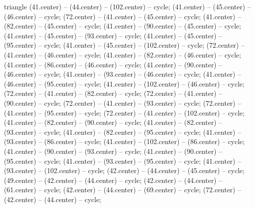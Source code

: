 \begin{pgfonlayer}{triangle}
 (41.center) -- (44.center) -- (102.center) -- cycle; 
 (41.center) -- (45.center) -- (46.center) -- cycle; 
 (72.center) -- (41.center) -- (45.center) -- cycle; 
 (41.center) -- (82.center) -- (45.center) -- cycle; 
 (41.center) -- (90.center) -- (45.center) -- cycle; 
 (41.center) -- (45.center) -- (93.center) -- cycle; 
 (41.center) -- (45.center) -- (95.center) -- cycle; 
 (41.center) -- (45.center) -- (102.center) -- cycle; 
 (72.center) -- (41.center) -- (46.center) -- cycle; 
 (41.center) -- (82.center) -- (46.center) -- cycle; 
 (41.center) -- (86.center) -- (46.center) -- cycle; 
 (41.center) -- (90.center) -- (46.center) -- cycle; 
 (41.center) -- (93.center) -- (46.center) -- cycle; 
 (41.center) -- (46.center) -- (95.center) -- cycle; 
 (41.center) -- (102.center) -- (46.center) -- cycle; 
 (72.center) -- (41.center) -- (82.center) -- cycle; 
 (72.center) -- (41.center) -- (90.center) -- cycle; 
 (72.center) -- (41.center) -- (93.center) -- cycle; 
 (72.center) -- (41.center) -- (95.center) -- cycle; 
 (72.center) -- (41.center) -- (102.center) -- cycle; 
 (41.center) -- (82.center) -- (90.center) -- cycle; 
 (41.center) -- (82.center) -- (93.center) -- cycle; 
 (41.center) -- (82.center) -- (95.center) -- cycle; 
 (41.center) -- (93.center) -- (86.center) -- cycle; 
 (41.center) -- (102.center) -- (86.center) -- cycle; 
 (41.center) -- (90.center) -- (93.center) -- cycle; 
 (41.center) -- (90.center) -- (95.center) -- cycle; 
 (41.center) -- (93.center) -- (95.center) -- cycle; 
 (41.center) -- (93.center) -- (102.center) -- cycle; 
 (42.center) -- (44.center) -- (45.center) -- cycle; 
 (49.center) -- (42.center) -- (44.center) -- cycle; 
 (42.center) -- (44.center) -- (61.center) -- cycle; 
 (42.center) -- (44.center) -- (69.center) -- cycle; 
 (72.center) -- (42.center) -- (44.center) -- cycle; 

\end{pgfonlayer}
